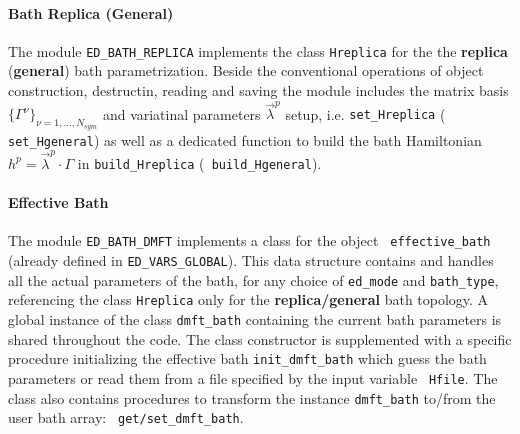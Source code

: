 \documentclass[edipack2.tex]{subfiles}
\begin{document}
\paragraph{Bath Replica (General)}
The module {\tt ED\_BATH\_REPLICA} implements the class {\tt Hreplica}
for the  the {\bf replica} ({\bf general}) bath parametrization. Beside the
conventional operations of object construction, destructin, reading
and saving the module includes the matrix basis $\{ \Gamma^\nu
\}_{\nu=1,\dots,N_{sym}}$ and variatinal parameters 
$\vec{\lambda}^p$ setup, i.e. {\tt set\_Hreplica} ({\tt
  set\_Hgeneral}) as well as a dedicated function to build  the bath Hamiltonian $h^p =
\vec{\lambda}^p\cdot \Gamma$ in {\tt build\_Hreplica} ({\tt
  build\_Hgeneral}).


\paragraph{Effective Bath}
The module {\tt ED\_BATH\_DMFT} implements a class for the object {\tt
  effective\_bath} (already defined in {\tt ED\_VARS\_GLOBAL}). This
data structure contains and handles all the actual parameters of the
bath, for any choice of {\tt ed\_mode} and {\tt bath\_type},
referencing the class {\tt Hreplica} only for the {\bf
  replica/general} bath topology.
A global instance of the class {\tt dmft\_bath}  containing the
current bath parameters is shared throughout the code.   
The class constructor is supplemented with a specific procedure initializing
the effective bath {\tt init\_dmft\_bath} which guess the bath
parameters or read them from a file specified by the input variable {\tt
  Hfile}.
The class also contains procedures to transform the instance
{\tt dmft\_bath} to/from the user bath array: {\tt
  get/set\_dmft\_bath}.
\end{document}
